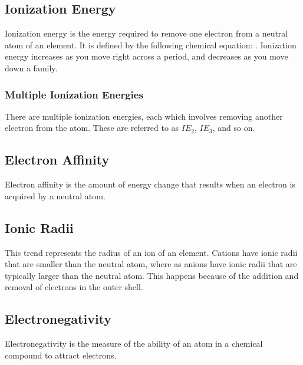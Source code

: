 \subsection{Ionization Energy}
Ionization energy is the energy required to remove one electron from a neutral
atom of an element.  It is defined by the following chemical equation: .  Ionization energy increases as you move right across a
period, and decreases as you move down a family.

\subsubsection{Multiple Ionization Energies}
There are multiple ionization energies, each which involves removing another
electron from the atom.  These are referred to as $IE_2$, $IE_3$, and so on.

\subsection{Electron Affinity}
Electron affinity is the amount of energy change that results when an electron
is acquired by a neutral atom.

\subsection{Ionic Radii}
This trend represents the radius of an ion of an element.  Cations have ionic
radii that are smaller than the neutral atom, where as anions have ionic radii
that are typically larger than the neutral atom.  This happens because of the
addition and removal of electrons in the outer shell.

\subsection{Electronegativity}
Electronegativity is the measure of the ability of an atom in a chemical
compound to attract electrons.
